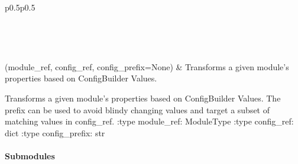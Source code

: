\documentclass[letterpaper,10pt,english]{sphinxmanual}
\begin{document}
\begin{savenotes}\sphinxatlongtablestart\begin{longtable}[c]{p{0.5\linewidth}p{0.5\linewidth}}
\hline

\endfirsthead

%
{}\\
\hline

\endhead

\hline
{}\\
\endfoot

\endlastfoot

{\hyperref[\detokenize{autoapi/pine/backend/shared/transform/index:pine.backend.shared.transform.transform_module_by_config}]{}}(module\_ref, config\_ref, config\_prefix=None)
&
Transforms a given module’s properties based on ConfigBuilder Values.
\\
\hline
\end{longtable}\sphinxatlongtableend\end{savenotes}

\begin{fulllineitems}
\label{\detokenize{autoapi/pine/backend/shared/transform/index:pine.backend.shared.transform.transform_module_by_config}}
Transforms a given module’s properties based on ConfigBuilder Values.
The prefix can be used to avoid blindy changing values and target a subset of matching values in config\_ref.
:type module\_ref: ModuleType
:type config\_ref: dict
:type config\_prefix: str

\end{fulllineitems}



\paragraph{Submodules}
\label{\detokenize{autoapi/pine/backend/index:submodules}}
\end{document}
